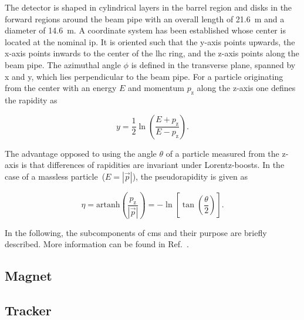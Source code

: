 
The detector is shaped in cylindrical layers in the barrel region and disks in the forward regions around the beam pipe with an overall length of 21.6~m and a diameter of 14.6~m. A coordinate system has been established whose center is located at the nominal \gls{ip}. It is oriented such that the y-axis points upwards, the x-axis points inwards to the center of the \gls{lhc} ring, and the z-axis points along the beam pipe. The azimuthal angle $\phi$ is defined in the transverse plane, spanned by x and y, which lies perpendicular to the beam pipe. For a particle originating from the center with an energy $E$ and momentum $p_\mathrm{z}$ along the z-axis one defines the rapidity as

\begin{equation}
y=\frac{1}{2}\ln\left(\frac{E+p_\mathrm{z}}{E-p_\mathrm{z}}\right). \label{eq:experiment-rapidity}
\end{equation}

The advantage opposed to using the angle $\theta$ of a particle measured from the z-axis is that differences of rapidities are invariant under Lorentz-boosts. In the case of a massless particle~($E=|\vec{p}|$), the pseudorapidity is given as

\begin{equation}
\eta=\mathrm{artanh}\left(\frac{p_\mathrm{z}}{|\vec{p}|}\right)=-\ln\left[\tan\left(\frac{\theta}{2}\right)\right]. \label{eq:experiment-pseudorapidity}
\end{equation}

In the following, the subcomponents of \gls{cms} and their purpose are briefly described. More information can be found in Ref.~\cite{Chatrchyan:2008aa}.


\subsection{Magnet}

\cite{Acquistapace:1997fm}

\subsection{Tracker}



